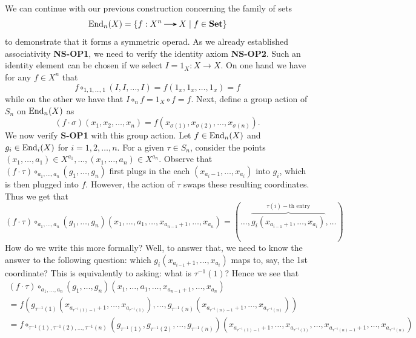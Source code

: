 \begin{example}
    We can continue with our previous construction concerning 
    the family of sets 
    \[
        \aend_n(X) = \{f: X^n \to X \mid f \in \textbf{Set}\}
    \]
    to demonstrate that it 
    forms a symmetric operad. As we already established associativity \textbf{NS-OP1}, we need 
    to verify the identity axiom \textbf{NS-OP2}. Such an identity element can be chosen if 
    we select $I = 1_X: X \to X$. On one hand we have for any $f \in X^n$ that
    \[
        f \circ_{1, 1, \dots, 1}(I, I, \dots, I) = f(1_x, 1_x, \dots, 1_x) = f
    \]
    while on the other we have that $I \circ_n f = 1_X \circ f = f$. 
    Next, define a group action of $S_n$ on $\operatorname{\mathrm{End}}_n(X)$ as 
    \[
        (f \cdot \sigma)(x_1, x_2, \dots, x_n) = f(x_{\sigma(1)}, x_{\sigma(2)}, \dots, x_{\sigma(n)}).
    \]
    We now verify \textbf{S-OP1} with this group action. 
    Let $f \in \operatorname{\mathrm{End}}_n(X)$ and $g_i \in \operatorname{\mathrm{End}}_i(X)$ for $i = 1, 2, \dots, n$.
    For a given $\tau \in S_n$, consider the points $(x_1, \dots, a_1) \in X^{a_1}, \dots, (x_1, \dots, a_n) \in X^{a_n}$.
    Observe that $(f \cdot \tau) \circ_{a_1, \dots, a_n}(g_1, \dots, g_n)$ first plugs in 
    the each $(x_{a_{i}-1}, \dots, x_{a_i})$ into $g_i$, which is then 
    plugged into $f$. However, the action of $\tau$ swaps these resulting coordinates. 
    Thus we get that 
    \[
        (f \cdot \tau) \circ_{a_1, \dots, a_n}(g_1, \dots, g_n)(x_1, \dots, a_1, \dots, x_{a_{n-1}+1}, \dots, x_{a_n})
        = 
        (\dots, \overbrace{g_i(x_{a_{i-1}+1}, \dots, x_{a_i})}^{\tau(i)-\text{th entry}}, \dots )
    \]
    How do we write this more formally? Well, to answer that, we need to know the answer 
    to the following question: which $g_i(x_{a_{i-1}+1}, \dots, x_{a_i})$
    maps to, say, the 1st coordinate? This is equivalently to asking: what is $\tau^{-1}(1)$? 
    Hence we see that 
    \begin{gather*}
        (f \cdot \tau) \circ_{a_1, \dots, a_n}(g_1, \dots, g_n)(x_1, \dots, a_1, \dots, x_{a_{n-1}+1}, \dots, x_{a_n})\\
        =
        f(g_{\tau^{-1}(1)}(x_{a_{\tau^{-1}(1)-1}+1}, \dots, x_{a_{\tau^{-1}(1)}}), \dots, g_{\tau^{-1}(n)}(x_{a_{\tau^{-1}(n)-1}+1}, \dots, x_{a_{\tau^{-1}(n)}}))\\
        = 
        f \circ_{\tau^{-1}(1), \tau^{-1}(2), \dots, \tau^{-1}(n)}(g_{\tau^{-1}(1)}, g_{\tau^{-1}(2)}, \dots, g_{\tau^{-1}(n)})
        (x_{a_{\tau^{-1}(1)-1}+1}, \dots, x_{a_{\tau^{-1}(1)}}, \dots, x_{a_{\tau^{-1}(n)-1}+1}, \dots, x_{a_{\tau^{-1}(n)}})\\

\end{gather*}
\end{example}
